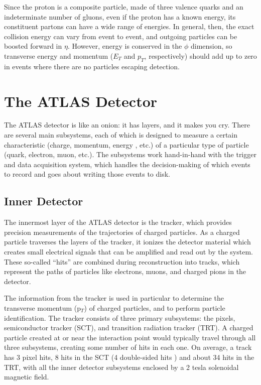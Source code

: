 Since the proton is a composite particle, made of three valence quarks and an indeterminate number of gluons, even 
if the proton has a known energy, its constituent partons can have a wide range of energies.  In 
general, then, the exact collision energy can vary from event to event, and outgoing particles can be 
boosted forward in $\eta$.  However, energy is conserved in the $\phi$ dimension, so transverse 
energy and momentum ($E_T$ and $p_T$, respectively) should add up to zero in events where there are no particles escaping detection.

\section{The ATLAS Detector}
The ATLAS detector is like an onion: it has layers, and it makes you cry.  There are 
several main subsystems, each of which is designed to measure a certain characteristic (charge, momentum, energy
, etc.) of a particular type of particle (quark, electron, muon, etc.).  The subsystems 
work hand-in-hand with the trigger and data acquisition system, which handles the decision-making 
of which events to record and goes about writing those events to disk.  

\subsection{Inner Detector}
The innermost layer of the ATLAS detector is the tracker, which provides precision measurements of the trajectories of charged 
particles.  As a charged particle traverses the layers of the tracker, it ionizes the detector material which creates 
small electrical signals that can be amplified and read out by the system.  These so-called ``hits'' 
are combined during reconstruction into tracks, which represent the paths of particles like electrons, muons, and charged 
pions in the detector.

The information from the tracker is used in particular to determine the transverse momentum (p$_T$) of 
charged particles, and to perform particle identification.  The tracker consists of three primary subsystems: the pixels, 
semiconductor tracker (SCT), and transition radiation tracker (TRT).  A charged particle created at or near the 
interaction point would typically travel through all three subsystems, creating some number of hits in each one.  On 
average, a track has 3 pixel hits, 8 hits in the SCT (4 double-sided hits
) and about 34 hits in the TRT, with all the inner detector subsystems enclosed by a 2 tesla solenoidal magnetic field. 


